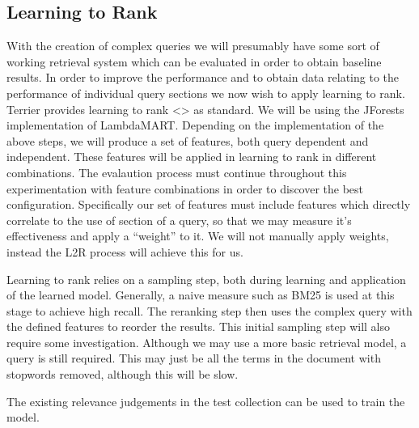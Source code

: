 \documentclass{mprop}
\begin{document}

\subsection{Learning to Rank}
With the creation of complex queries we will presumably have some sort of working retrieval system which can be evaluated in order to obtain baseline results.
In order to improve the performance and to obtain data relating to the performance of individual query sections we now wish to apply learning to rank.
Terrier provides learning to rank <> as standard.
We will be using the JForests implementation of LambdaMART.
Depending on the implementation of the above steps, we will produce a set of features, both query dependent and independent.
These features will be applied in learning to rank in different combinations.
The evalaution process must continue throughout this experimentation with feature combinations in order to discover the best configuration.
Specifically our set of features must include features which directly correlate to the use of section of a query, so that we may measure it's effectiveness and apply a ``weight'' to it.
We will not manually apply weights, instead the L2R process will achieve this for us.

Learning to rank relies on a sampling step, both during learning and application of the learned model.
Generally, a naive measure such as BM25 is used at this stage to achieve high recall.
The reranking step then uses the complex query with the defined features to reorder the results.
This initial sampling step will also require some investigation.
Although we may use a more basic retrieval model, a query is still required.
This may just be all the terms in the document with stopwords removed, although this will be slow.

The existing relevance judgements in the test collection can be used to train the model. 


\end{document}
